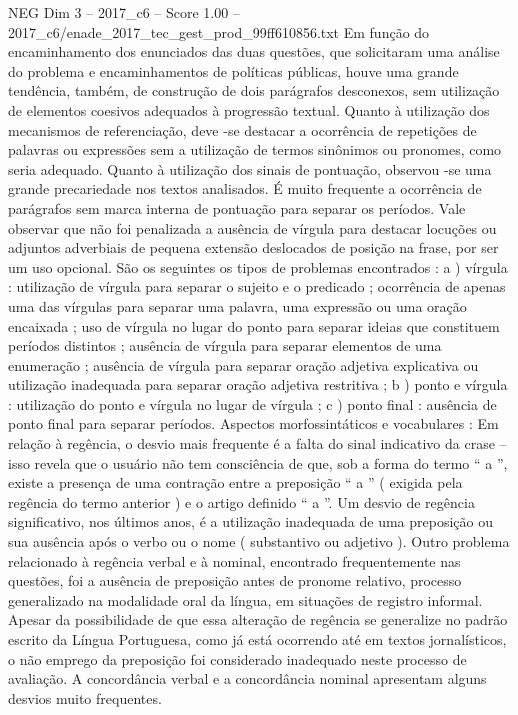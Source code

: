 \begin{textsample}{NEG Dim 3 – 2017\_c6 – Score 1.00 – 2017\_c6/enade\_2017\_tec\_gest\_prod\_99ff610856.txt}
Em função do encaminhamento dos enunciados das duas questões, que solicitaram uma análise do problema e encaminhamentos de políticas públicas, houve uma grande tendência, também, de construção de dois parágrafos desconexos, sem utilização de elementos coesivos adequados à progressão textual.
Quanto à utilização dos mecanismos de referenciação, deve -se destacar a ocorrência de repetições de palavras ou expressões sem a utilização de termos sinônimos ou pronomes, como seria adequado.
Quanto à utilização dos sinais de pontuação, observou -se uma grande precariedade nos textos analisados.
É muito frequente a ocorrência de parágrafos sem marca interna de pontuação para separar os períodos.
Vale observar que não foi penalizada a ausência de vírgula para destacar locuções ou adjuntos adverbiais de pequena extensão deslocados de posição na frase, por ser um uso opcional.
São os seguintes os tipos de problemas encontrados : a ) vírgula : utilização de vírgula para separar o sujeito e o predicado ; ocorrência de apenas uma das vírgulas para separar uma palavra, uma expressão ou uma oração encaixada ; uso de vírgula no lugar do ponto para separar ideias que constituem períodos distintos ; ausência de vírgula para separar elementos de uma enumeração ; ausência de vírgula para separar oração adjetiva explicativa ou utilização inadequada para separar oração adjetiva restritiva ; b ) ponto e vírgula : utilização do ponto e vírgula no lugar de vírgula ; c ) ponto final : ausência de ponto final para separar períodos.
Aspectos morfossintáticos e vocabulares : Em relação à regência, o desvio mais frequente é a falta do sinal indicativo da crase – isso revela que o usuário não tem consciência de que, sob a forma do termo “ a ”, existe a presença de uma contração entre a preposição “ a ” ( exigida pela regência do termo anterior ) e o artigo definido “ a ”.
Um desvio de regência significativo, nos últimos anos, é a utilização inadequada de uma preposição ou sua ausência após o verbo ou o nome ( substantivo ou adjetivo ).
Outro problema relacionado à regência verbal e à nominal, encontrado frequentemente nas questões, foi a ausência de preposição antes de pronome relativo, processo generalizado na modalidade oral da língua, em situações de registro informal.
Apesar da possibilidade de que essa alteração de regência se generalize no padrão escrito da Língua Portuguesa, como já está ocorrendo até em textos jornalísticos, o não emprego da preposição foi considerado inadequado neste processo de avaliação.
A concordância verbal e a concordância nominal apresentam alguns desvios muito frequentes.

\end{textsample}
